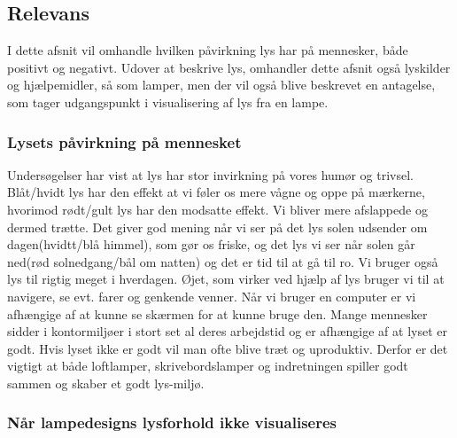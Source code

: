 \subsection{Relevans}
I dette afsnit vil omhandle hvilken påvirkning lys har på mennesker, både positivt og negativt. Udover at beskrive lys, omhandler dette afsnit også lyskilder og hjælpemidler, så som lamper, men der vil også blive beskrevet en antagelse, som tager udgangspunkt i visualisering af lys fra en lampe. 

\subsubsection{Lysets påvirkning på mennesket}

Undersøgelser har vist at lys har stor invirkning på vores humør og trivsel.
Blåt/hvidt lys har den effekt at vi føler os mere vågne og oppe på mærkerne\cite{videnskab_dk_paavirkning}, hvorimod rødt/gult lys har den modsatte effekt. Vi bliver mere afslappede og dermed trætte. Det giver god mening når vi ser på det lys solen udsender om dagen(hvidtt/blå himmel), som gør os friske, og det lys vi ser når solen går ned(rød solnedgang/bål om natten) og det er tid til at gå til ro. Vi bruger også lys til rigtig meget i hverdagen. Øjet, som virker ved hjælp af lys bruger vi til at navigere, se evt. farer og genkende venner. Når vi bruger en computer er vi afhængige af at kunne se skærmen for at kunne bruge den. Mange mennesker sidder i kontormiljøer i stort set al deres arbejdstid og er afhængige af at lyset er godt. Hvis lyset ikke er godt vil man ofte blive træt og uproduktiv. Derfor er det vigtigt at både loftlamper, skrivebordslamper og indretningen spiller godt sammen og skaber et godt lys-miljø.


\subsubsection{Når lampedesigns lysforhold ikke visualiseres}


